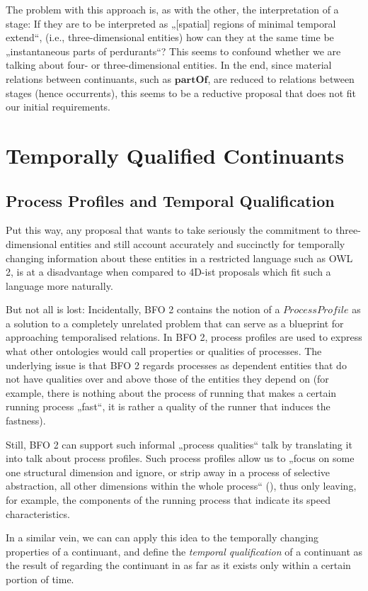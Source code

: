 \documentclass{ao2e}
\newcommand{\mirel}[1]{\ensuremath{\mathrm{\mathbf{#1}}}}
\newcommand{\mclass}[1]{\ensuremath{\mathit{#1}}}
\begin{document}
The problem with this approach is, as with the other, the interpretation of a
stage: If they are to be interpreted as „[spatial] regions of minimal temporal
extend“, (i.e., three-dimensional entities) how can they at the same time be
„instantaneous parts of perdurants“?
This seems to confound whether we are talking about four- or three-dimensional
entities. In the end, since material relations between continuants, such as
\mirel{partOf}, are reduced to relations between stages (hence occurrents), this
seems to be a reductive proposal that does not fit our initial requirements.

\section{Temporally Qualified Continuants}
\subsection{Process Profiles and Temporal Qualification}
Put this way, any proposal that wants to take seriously the commitment to
three-dimensional entities and still account accurately and succinctly for
temporally changing information about these entities in a restricted language
such as OWL 2, is at a disadvantage when compared to 4D-ist proposals which fit
such a language more naturally. 

But not all is lost: Incidentally, BFO 2 contains the notion of a
\mclass{ProcessProfile} as a solution to a completely
unrelated problem that can serve as a blueprint for approaching temporalised
relations. In BFO 2, process profiles are used to express what other ontologies
would call properties or qualities of processes. The underlying issue is that
BFO 2 regards processes as dependent entities that do not have qualities
over and above those of the entities they depend on (for example, there is nothing about
the process of running that makes a certain running process „fast“, it is rather
a quality of the runner that induces the fastness). 

Still, BFO 2 can support such informal „process qualities“ talk by translating
it into talk about process profiles. Such process profiles allow us to „focus on some one
structural dimension and ignore, or strip away in a process of selective
abstraction, all other dimensions within the whole process“ (\cite{BFO2:ref}), thus only 
leaving, for example, the components of the running process that indicate its speed
characteristics. 

In a similar vein, we can can apply this idea to the temporally changing
properties of a continuant, and define the \emph{temporal qualification} of a
continuant as the result of regarding the continuant in as far as it exists only
within a certain portion of time.
\end{document}
